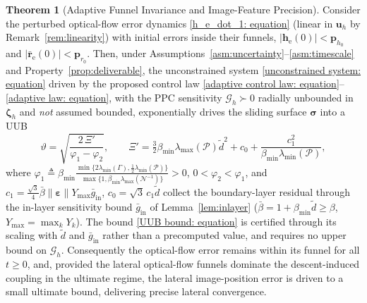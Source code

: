 \documentclass{IEEEtaes}
\theoremstyle{definition}
\newtheorem{theorem}{Theorem}
\theoremstyle{remark}
\begin{document}
\begin{theorem}[Adaptive Funnel Invariance and Image-Feature Precision]\label{thm:precision}
Consider the perturbed optical-flow error dynamics \eqref{h_e_dot_1: equation} (linear in $\boldsymbol{u}_h$ by Remark~\ref{rem:linearity}) with initial errors inside their funnels, $|\boldsymbol{h}_\text{e}(0)|<\boldsymbol{p}_{h_0}$ and $|\bar{\boldsymbol{r}}_\text{e}(0)|<\boldsymbol{p}_{r_0}$. Then, under Assumptions~\ref{asm:uncertainty}--\ref{asm:timescale} and Property~\ref{prop:deliverable}, the unconstrained system \eqref{unconstrained system: equation} driven by the proposed control law \eqref{adaptive control law: equation}--\eqref{adaptive law: equation}, with the PPC sensitivity $\mathcal{G}_h\succ0$ radially unbounded in $\boldsymbol{\zeta}_h$ and \emph{not} assumed bounded, exponentially drives the sliding surface $\boldsymbol{\sigma}$ into a UUB
\begin{equation} \label{UUB bound: equation}
    \vartheta = \sqrt{\frac{2\,\Xi'}{\varphi_1-\varphi_2}},\qquad
    \Xi' = \tfrac32\beta_{\min}\lambda_{\max}(\mathcal{P})\tilde{d}^2 + c_0 + \frac{c_1^2}{\beta_{\min}\lambda_{\min}(\mathcal{P})},
\end{equation}
where $\varphi_1 \triangleq \beta_{\min}\frac{\min\{2\lambda_{\min}(\Gamma),\tfrac12\lambda_{\min}(\mathcal{P})\}}{\max\{1,\beta_{\min}\lambda_{\max}(\mathcal{N}^{-1})\}}>0$, $0<\varphi_2<\varphi_1$, and $c_1 = \tfrac{\sqrt3}{4}\bar{\beta}\|\boldsymbol{\varepsilon}\|Y_{\max}\bar{g}_\text{in}$, $c_0 = \sqrt3\,c_1\tilde{d}$ collect the boundary-layer residual through the in-layer sensitivity bound $\bar{g}_\text{in}$ of Lemma~\ref{lem:inlayer} ($\bar{\beta}=1+\beta_{\min}\tilde{d}\ge\beta$, $Y_{\max}=\max_k Y_k$). The bound \eqref{UUB bound: equation} is certified through its scaling with $\tilde{d}$ and $\bar{g}_\text{in}$ rather than a precomputed value, and requires no upper bound on $\mathcal{G}_h$. Consequently the optical-flow error remains within its funnel for all $t\ge 0$, and, provided the lateral optical-flow funnels dominate the descent-induced coupling in the ultimate regime, the lateral image-position error is driven to a small ultimate bound, delivering precise lateral convergence.
\end{theorem}
\end{document}
